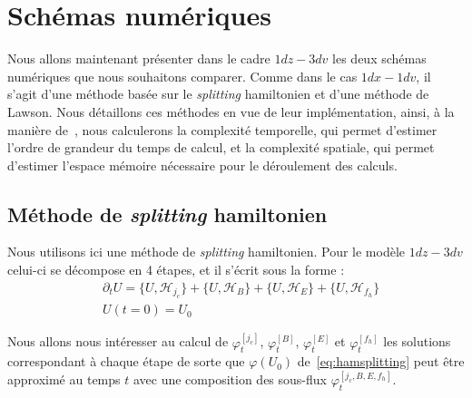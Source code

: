
\section{Schémas numériques}
\label{sec:3:scheme}

Nous allons maintenant présenter dans le cadre $1dz-3dv$ les deux schémas numériques que nous souhaitons comparer. Comme dans le cas $1dx-1dv$, il s'agit d'une méthode basée sur le \emph{splitting} hamiltonien et d'une méthode de Lawson. Nous détaillons ces méthodes en vue de leur implémentation, ainsi, à la manière de~\cite{Saramito:2013}, nous calculerons la complexité temporelle, qui permet d'estimer l'ordre de grandeur du temps de calcul, et la complexité spatiale, qui permet d'estimer l'espace mémoire nécessaire pour le déroulement des calculs.

\subsection{Méthode de \emph{splitting} hamiltonien}

Nous utilisons ici une méthode de \emph{splitting} hamiltonien. Pour le modèle $1dz-3dv$ celui-ci se décompose en 4 étapes, et il s'écrit sous la forme :
\begin{equation}
  \begin{aligned}
    & \partial_t U = \{ U,\mathcal{H}_{j_c}\} + \{ U,\mathcal{H}_B\} + \{ U,\mathcal{H}_E\} + \{ U,\mathcal{H}_{f_h}\} \\
    & U(t=0) = U_0
  \end{aligned}
  \label{eq:hamsplitting}
\end{equation}

Nous allons nous intéresser au calcul de $\varphi_t^{[j_c]}$, $\varphi_t^{[B]}$, $\varphi_t^{[E]}$ et $\varphi_t^{[f_h]}$ les solutions correspondant à chaque étape de sorte que $\varphi(U_0)$ de~\eqref{eq:hamsplitting} peut être approximé au temps $t$ avec une composition des sous-flux $\varphi_t^{[j_c,B,E,f_h]}$.

